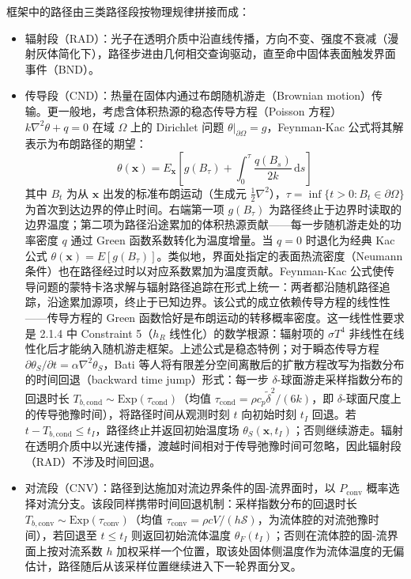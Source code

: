框架中的路径由三类路径段按物理规律拼接而成：
\begin{itemize}
    \item 辐射段（RAD）：光子在透明介质中沿直线传播，方向不变、强度不衰减（漫射灰体简化下），路径步进由几何相交查询驱动，直至命中固体表面触发界面事件（BND）。
    \item 传导段（CND）：热量在固体内通过布朗随机游走（Brownian motion）传输。更一般地，考虑含体积热源的稳态传导方程（Poisson 方程）$k\nabla^2\theta + q = 0$ 在域 $\Omega$ 上的 Dirichlet 问题 $\theta|_{\partial\Omega} = g$，Feynman-Kac 公式\cite{kacRandomWalkTheory1947}将其解表示为布朗路径的期望：
    \begin{equation}
        \theta(\mathbf{x}) = E_{\mathbf{x}}\!\left[g(B_\tau) + \int_0^\tau \frac{q(B_s)}{2k}\,\mathrm{d}s\right]
        \label{eq:feynman_kac}
    \end{equation}
    其中 $B_t$ 为从 $\mathbf{x}$ 出发的标准布朗运动（生成元 $\frac{1}{2}\nabla^2$），$\tau = \inf\{t > 0 : B_t \in \partial\Omega\}$ 为首次到达边界的停止时间。右端第一项 $g(B_\tau)$ 为路径终止于边界时读取的边界温度；第二项为路径沿途累加的体积热源贡献——每一步随机游走处的功率密度 $q$ 通过 Green 函数系数转化为温度增量。当 $q=0$ 时退化为经典 Kac 公式 $\theta(\mathbf{x}) = E[g(B_\tau)]$\cite{treganCouplingRadiativeConductive2023}。类似地，界面处指定的表面热流密度（Neumann 条件）也在路径经过时以对应系数累加为温度贡献。Feynman-Kac 公式使传导问题的蒙特卡洛求解与辐射路径追踪在形式上统一：两者都沿随机路径追踪，沿途累加源项，终止于已知边界。该公式的成立依赖传导方程的线性性——传导方程的 Green 函数恰好是布朗运动的转移概率密度。这一线性性要求是 2.1.4 中 Constraint 5（$h_R$ 线性化）的数学根源：辐射项的 $\sigma T^4$ 非线性在线性化后才能纳入随机游走框架。上述公式是稳态特例；对于瞬态传导方程 $\partial\theta_S / \partial t = \alpha \nabla^2 \theta_S$，Bati 等人\cite{batiCouplingConductionConvection2023}将有限差分空间离散后的扩散方程改写为指数分布的时间回退（backward time jump）形式：每一步 $\delta$-球面游走采样指数分布的回退时长 $T_{b,\text{cond}} \sim \mathrm{Exp}(\tau_\text{cond})$（均值 $\tau_\text{cond} = \rho c_p \tilde{\delta}^2 / (6k)$，即 $\delta$-球面尺度上的传导弛豫时间），将路径时间从观测时刻 $t$ 向初始时刻 $t_I$ 回退。若 $t - T_{b,\text{cond}} \leq t_I$，路径终止并返回初始温度场 $\theta_S(\mathbf{x}, t_I)$；否则继续游走。辐射在透明介质中以光速传播，渡越时间相对于传导弛豫时间可忽略，因此辐射段（RAD）不涉及时间回退。
    \item 对流段（CNV）：路径到达施加对流边界条件的固-流界面时，以 $P_\text{conv}$ 概率选择对流分支。该段同样携带时间回退机制：采样指数分布的回退时长 $T_{b,\text{conv}} \sim \mathrm{Exp}(\tau_\text{conv})$（均值 $\tau_\text{conv} = \rho c V / (h\mathcal{S})$，为流体腔的对流弛豫时间），若回退至 $t \leq t_I$ 则返回初始流体温度 $\theta_F(t_I)$；否则在流体腔的固-流界面上按对流系数 $h$ 加权采样一个位置，取该处固体侧温度作为流体温度的无偏估计，路径随后从该采样位置继续进入下一轮界面分叉。
\end{itemize}

